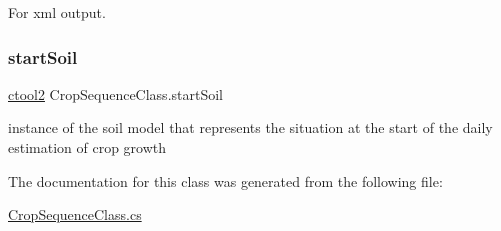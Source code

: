 For xml output. 

\mbox{\label{class_crop_sequence_class_ab6529f542f15e934ba631c83e17224f1}} 
\subsubsection{\texorpdfstring{startSoil}{startSoil}}
{\footnotesize\ttfamily \mbox{\hyperlink{classctool2}{ctool2}} Crop\+Sequence\+Class.\+start\+Soil}



instance of the soil model that represents the situation at the start of the daily estimation of crop growth 



The documentation for this class was generated from the following file\+:\begin{DoxyCompactItemize}
\item 
\mbox{\hyperlink{_crop_sequence_class_8cs}{Crop\+Sequence\+Class.\+cs}}\end{DoxyCompactItemize}
